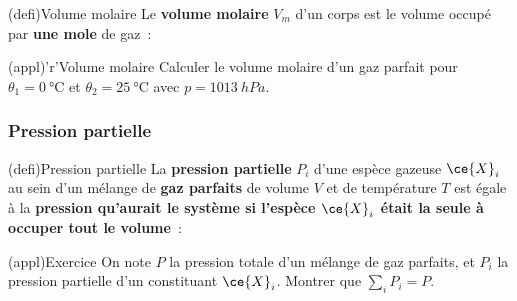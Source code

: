 \documentclass[../../main/main.tex]{subfiles}
\begin{document}
\begin{tcbraster}[raster columns=2, raster equal height=rows]
	\begin{tcb}[label=def:volmol](defi){Volume molaire}
		Le \textbf{volume molaire} $V_m$ d'un corps est le volume occupé par
		\textbf{une mole} de gaz~:
		\psw{
			\[\boxed{V_m = \frac{V}{n}} \Leftrightarrow n = \frac{V}{V_m}\]
		}
	\end{tcb}
	\begin{tcb}[label=exem:volmol](appl)'r'{Volume molaire}
		Calculer le volume molaire d'un gaz parfait pour $\theta_1 =
			\SI{0}{\degreeCelsius}$ et $\theta_2 = \SI{25}{\degreeCelsius}$ avec $p
			= \SI{1013}{hPa}$.
		\tcblower

	\end{tcb}
\end{tcbraster}

\subsubsection{Pression partielle}
\begin{tcb}[label=def:ppartielle](defi){Pression partielle}
	La \textbf{pression partielle} $P_i$ d'une espèce gazeuse $\ce{X}_i$ au
	sein d'un mélange de \textbf{gaz parfaits} de volume $V$ et de température $T$ est
	égale à la \textbf{pression qu'aurait le système si l'espèce $\ce{X}_i$
		était la seule à occuper tout le volume}~:
	\psw{
		\[\boxed{P_iV = n_{g,i} RT}\]
	}
\end{tcb}
\begin{tcb}[width=\linewidth](appl){Exercice}
	On note $P$ la pression totale d'un mélange de gaz parfaits, et $P_i$ la
	pression partielle d'un constituant $\ce{X}_i$. Montrer que $\sum_i P_i = P$.
	\tcblower
	\psw{
		\[
			\sum_i P_i = \sum_i \frac{n_{g,i}RT}{V} = \frac{RT}{V} \sum_i n_{g,i} =
			\frac{n_{g,\tot}RT}{V} = P
			\qed
		\]
	}
\end{tcb}
\end{document}
